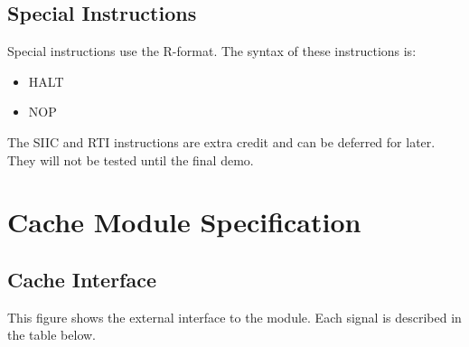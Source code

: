 \documentclass[11pt]{article}
\begin{document}
\subsection{Special Instructions}
Special instructions use the R-format. The syntax of these instructions is:
\begin{itemize}
\item HALT
\item NOP
\end{itemize}

The SIIC and RTI instructions are extra credit and can be deferred for later. They will not be tested until the final demo.


\clearpage
\section{Cache Module Specification}

\subsection{Cache Interface}
This figure shows the external interface to the module. Each signal is described in the table below.
\end{document}
